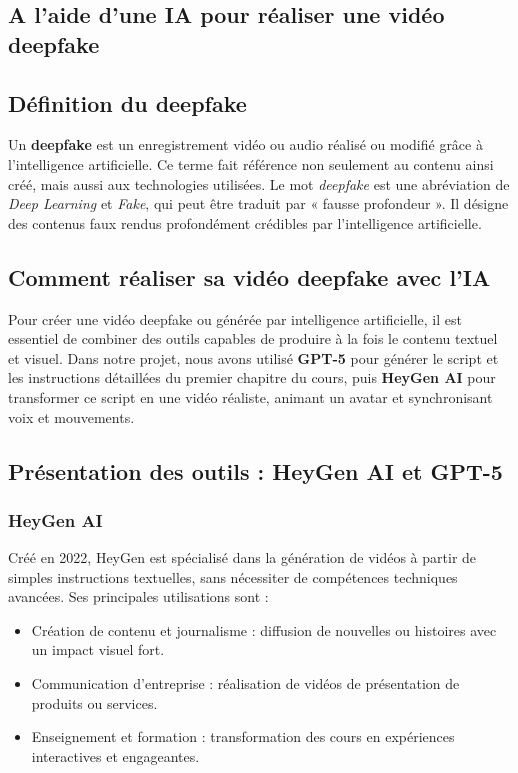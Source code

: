 \documentclass[12pt]{article}
\begin{document}
\begin{center}
\newpage
\section{A l'aide d'une IA pour réaliser une vidéo deepfake}

\subsection{Définition du deepfake}
Un \textbf{deepfake} est un enregistrement vidéo ou audio réalisé ou modifié grâce à l'intelligence artificielle. Ce terme fait référence non seulement au contenu ainsi créé, mais aussi aux technologies utilisées. Le mot \textit{deepfake} est une abréviation de \textit{Deep Learning} et \textit{Fake}, qui peut être traduit par « fausse profondeur ». Il désigne des contenus faux rendus profondément crédibles par l'intelligence artificielle.

\subsection{Comment réaliser sa vidéo deepfake avec l’IA}
Pour créer une vidéo deepfake ou générée par intelligence artificielle, il est essentiel de combiner des outils capables de produire à la fois le contenu textuel et visuel. Dans notre projet, nous avons utilisé \textbf{GPT-5} pour générer le script et les instructions détaillées du premier chapitre du cours, puis \textbf{HeyGen AI} pour transformer ce script en une vidéo réaliste, animant un avatar et synchronisant voix et mouvements.

\subsection{Présentation des outils : HeyGen AI et GPT-5}

\subsubsection{HeyGen AI}
Créé en 2022, HeyGen est spécialisé dans la génération de vidéos à partir de simples instructions textuelles, sans nécessiter de compétences techniques avancées. Ses principales utilisations sont :
\begin{itemize}[leftmargin=*, label=\textbullet]
    \item Création de contenu et journalisme : diffusion de nouvelles ou histoires avec un impact visuel fort.
    \item Communication d’entreprise : réalisation de vidéos de présentation de produits ou services.
    \item Enseignement et formation : transformation des cours en expériences interactives et engageantes.
\end{itemize}


\end{center}
\end{document}
